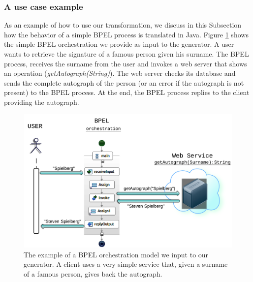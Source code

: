 \subsubsection{A use case example}
As an example of how to use our transformation, we discuss in this Subsection how the behavior of a simple BPEL process is translated in Java. Figure \ref{fig:BPELOrchestr} shows the simple BPEL orchestration we provide as input to the generator. A user wants to retrieve the signature of a famous person given his surname. The BPEL process, receives the surname from the user and invokes a web server that shows an operation (\textit{getAutograph(String)}). The web server checks its database and sends the complete autograph of the person (or an error if the autograph is not present) to the BPEL process. At the end, the BPEL process replies to the client providing the autograph.   
\begin{figure}
  \begin{center}
    \includegraphics[scale=1.2]{pictures/UseCaseExampleBPELOrchestr.png}
    \caption{The example of a BPEL orchestration model we input to our generator. A client uses a very simple service that, given a surname of a famous person, gives back the autograph.}
    \label{fig:BPELOrchestr}
  \end{center}
\end{figure}

